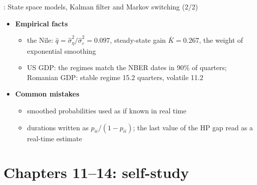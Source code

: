 \begin{frame}{: State space models, Kalman filter and Markov switching (2/2)}
\itemsize{\footnotesize}
\begin{itemize}
    \item \textbf{Empirical facts}
    \begin{itemize}
        \item the Nile: $\hat q = \hat\sigma^2_\eta/\hat\sigma^2_\varepsilon = 0.097$, steady-state gain $\bar K = 0.267$, the weight of exponential smoothing
        \item US GDP: the regimes match the NBER dates in 90\% of quarters; Romanian GDP: stable regime 15.2 quarters, volatile 11.2
    \end{itemize}
    \item \textbf{Common mistakes}
    \begin{itemize}
        \item smoothed probabilities used as if known in real time
        \item durations written as $p_{ii}/(1 - p_{ii})$; the last value of the HP gap read as a real-time estimate
    \end{itemize}
\end{itemize}
\end{frame}


\section{Chapters 11--14: self-study}

